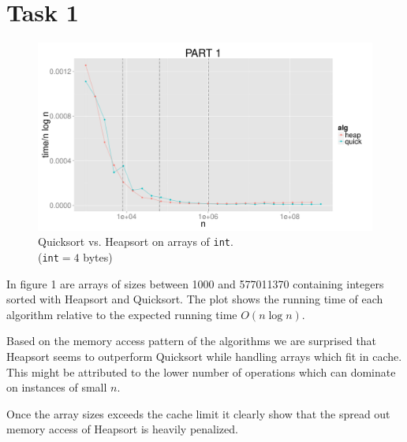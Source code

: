 \documentclass{article}
\begin{document}
\section*{Task 1}
\begin{figure}[H]
    \centering
    \includegraphics[width=
    \textwidth]{images/part1.pdf}
    \caption{Quicksort vs. Heapsort on arrays of \texttt{int}. 
    \\(\texttt{int}$= 4$ bytes)}
\end{figure}
In figure 1 are arrays of sizes between 1000 and 577011370 containing integers 
sorted with Heapsort and Quicksort. The plot shows the running time of each 
algorithm relative to the expected running time $O(n \log n)$. 

Based on the memory access pattern of the algorithms we are surprised that 
Heapsort seems to outperform Quicksort while handling arrays which fit in cache. 
This might be attributed to the lower number of operations which can dominate on 
instances of small $n$.

Once the array sizes exceeds the cache limit it clearly show that the spread out
memory access of Heapsort is heavily penalized.
\newpage
\end{document}
